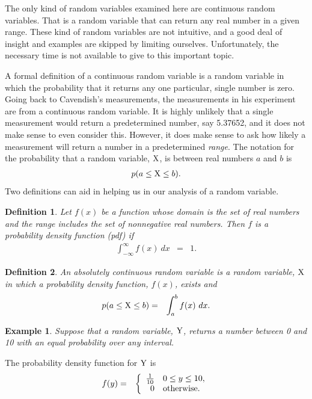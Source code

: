 \documentclass[12pt]{article}
\newtheorem{definition}{Definition}[section]
\newtheorem{example}{Example}[section]
\begin{document}
The only kind of random variables examined here are continuous random
variables. That is a random variable that can return any real number
in a given range. These kind of random variables are not intuitive,
and a good deal of insight and examples are skipped by limiting
ourselves. Unfortunately, the necessary time is not available to give
to this important topic.

A formal definition of a continuous random variable is a random
variable in which the probability that it returns any one particular,
single number is zero. Going back to Cavendish's measurements, the
measurements in his experiment are from a continuous random variable.
It is highly unlikely that a single measurement would return a
predetermined number, say 5.37652, and it does not make sense to even
consider this.  However, it does make sense to ask how likely a
measurement will return a number in a predetermined \textit{range}.
The notation for the probability that a random variable, $\rm{X}$, is
between real numbers $a$ and $b$ is
\begin{eqnarray*}
  p(a \leq {\rm X} \leq b).
\end{eqnarray*}
Two definitions can aid in helping us in our analysis of a random
variable.

\begin{definition}
  Let $f(x)$ be a function whose domain is the set of real numbers and
  the range includes the set of nonnegative real numbers. Then $f$ is
  a probability density function (pdf) if
  \begin{eqnarray*}
    \int^\infty_{-\infty} f(x) ~ dx & = & 1.
  \end{eqnarray*}
\end{definition}

\begin{definition}
  An absolutely continuous random variable is a random variable,
  $\rm{X}$ in which a probability density function, $f(x)$, exists and
  \begin{eqnarray*}
    p(a \leq {\rm X} \leq b) & = & \int^b_a f(x) ~ dx.
  \end{eqnarray*}
\end{definition}

\begin{example}
  Suppose that a random variable, ${\rm Y}$, returns a number between
  0 and 10 with an equal probability over any interval.
\end{example}

The probability density function for ${\rm Y}$ is
\begin{eqnarray}
  \label{eqn:unformZeroTen}
  f(y) & = & \left\{
    \begin{array}{r@{\hspace{1em}}l}
      \frac{1}{10} & 0\leq y \leq 10, \\
      0 & \mathrm{otherwise}. 
    \end{array}
    \right.
\end{eqnarray}
\end{document}
